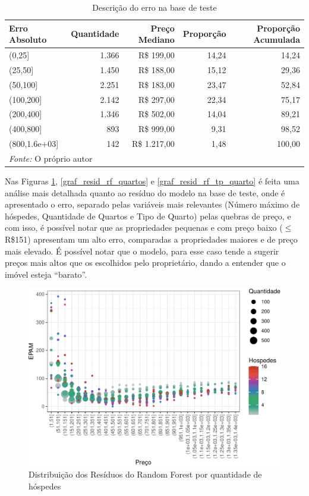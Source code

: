 \documentclass[
	12pt,				%
	a4paper,		%
	oneside,    %
	chapter=TITLE,		   %
	section=TITLE,		   %
	subsection=TITLE,	   %
	subsubsection=TITLE, %
	english,			%
	french,				%
	spanish,			%
	brazil,				%
]{abntex2}
\begin{document}
\begin{table}

\caption{\label{tab:erro_test}Descrição do erro na base de teste}
\centering
\begin{tabular}[t]{l|r|r|r|r}
\hline
Erro Absoluto & Quantidade & Preço Mediano & Proporção & Proporção Acumulada\\
\hline
(0,25] & 1.366 & R\$   199,00 & 14,24 & 14,24\\
\hline
(25,50] & 1.450 & R\$   188,00 & 15,12 & 29,36\\
\hline
(50,100] & 2.251 & R\$   183,00 & 23,47 & 52,84\\
\hline
(100,200] & 2.142 & R\$   297,00 & 22,34 & 75,17\\
\hline
(200,400] & 1.346 & R\$   502,00 & 14,04 & 89,21\\
\hline
(400,800] & 893 & R\$   999,00 & 9,31 & 98,52\\
\hline
(800,1.6e+03] & 142 & R\$ 1.217,00 & 1,48 & 100,00\\
\hline
\multicolumn{5}{l}{\textit{Fonte: } O próprio autor}\\
\end{tabular}
\end{table}

Nas Figuras \ref{graf_resid_rf_acom}, \ref{graf_resid_rf_quartos} e
\ref{graf_resid_rf_tp_quarto} é feita uma análise mais detalhada quanto
ao resíduo do modelo na base de teste, onde é apresentado o erro,
separado pelas variáveis mais relevantes (Número máximo de hóspedes,
Quantidade de Quartos e Tipo de Quarto) pelas quebras de preço, e com
isso, é possível notar que as propriedades pequenas e com preço baixo
(\(\leq\) R\$151) apresentam um alto erro, comparadas a propriedades
maiores e de preço mais elevado. É possível notar que o modelo, para
esse caso tende a sugerir preços mais altos que os escolhidos pelo
proprietário, dando a entender que o imóvel esteja ``barato''.

\begin{figure}
\centering
\includegraphics{00-TCC_files/figure-latex/graf_resid_rf_acom-1.pdf}
\caption{\label{graf_resid_rf_acom}Distribuição dos Resíduos do Random
Forest por quantidade de hóspedes}
\end{figure}
\end{document}
